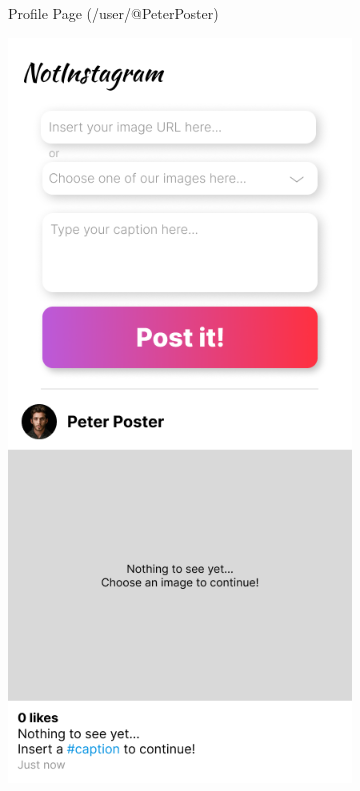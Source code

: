 \documentclass[a4paper, fontsize=11pt]{article}
\begin{document}
\begin{figure}[ht!]
\begin{subfigure}{0.49\linewidth}
\begin{center}
    \end{center}
    \caption{Profile Page (/user/@PeterPoster)}\label{subfig:user}
  \end{subfigure}
  \begin{subfigure}{0.49\linewidth}
    \begin{center}
      \includegraphics[width=\linewidth, height=0.3\textheight, keepaspectratio]{img/ig-clone/Beitrag erstellen.png}

\end{center}
\end{subfigure}
\end{figure}
\end{document}
